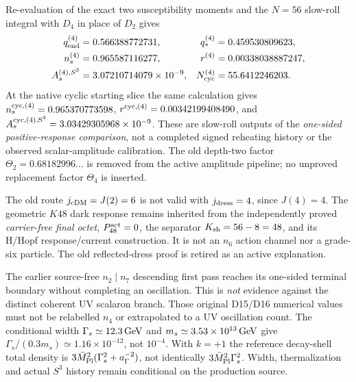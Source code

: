 \documentclass[12pt,a4paper]{article}
\begin{document}
\begin{theorem}[Recomputed rank-four inflation comparison, $N=56$]
\label{p8:thm:v2219-n4-inflation-replay}
Re-evaluation of the exact two susceptibility moments and the
$N=56$ slow-roll integral with $D_4$ in place of $D_2$ gives
\[
\begin{aligned}
q_{\rm end}^{(4)}&=0.566388772731,&
q_*^{(4)}&=0.459530809623,\\
n_s^{(4)}&=0.965587116277,&
r^{(4)}&=0.00338038887247,\\
A_s^{(4),S^3}&=3.07210714079\times10^{-9},&
N_{\rm cyc}^{(4)}&=55.6412246203.
\end{aligned}
\]
At the native cyclic starting slice the same calculation gives
$n_s^{\rm cyc,(4)}=0.965370773598$,
$r^{\rm cyc,(4)}=0.00342199408490$, and
$A_s^{\rm cyc,(4),S^3}=3.03429305968\times10^{-9}$.
These are slow-roll outputs of the \emph{one-sided positive-response
comparison}, not a completed signed reheating history or the observed
scalar-amplitude calibration.  The old depth-two factor
$\Theta_2=0.68182996\ldots$ is removed from the active amplitude
pipeline; no unproved replacement factor $\Theta_4$ is inserted.
\end{theorem}
\begin{remark}
The old route $j_{\rm cDM}=J(2)=6$ is not valid with $j_{\rm dress}=4$,
since $J(4)=4$. The geometric $K48$ dark response remains inherited from
the independently proved \emph{carrier-free final octet},
$P_{48}^{\rm act}=0$, the separator $K_{\rm sh}=56-8=48$,
and its H/Hopf response/current construction. It is not an $n_6$
action channel nor a grade-six particle. The old reflected-dress proof
is retired as an active explanation.
\end{remark}
\begin{remark}
The earlier source-free $n_2\mid n_7$ descending first pass reaches its
one-sided terminal boundary without completing an oscillation.  This is
\emph{not} evidence against the distinct coherent UV scalaron branch.
Those original D15/D16 numerical values must not be relabelled $n_4$
or extrapolated to a UV oscillation count.  The conditional width
$\Gamma_s\simeq12.3\,{\rm GeV}$ and
$m_s\simeq3.53\times10^{13}\,{\rm GeV}$ give
$\Gamma_s/(0.3m_s)\simeq1.16\times10^{-12}$,
not $10^{-4}$.  With $k=+1$ the reference decay-shell total density
is $3\bar M_{\rm Pl}^2(\Gamma_s^2+a_\Gamma^{-2})$, not identically
$3\bar M_{\rm Pl}^2\Gamma_s^2$. Width, thermalization and actual
$S^3$ history remain conditional on the production source.
\end{remark}
\end{document}
